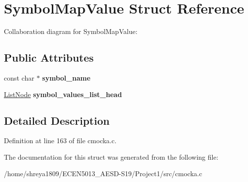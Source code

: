\hypertarget{structSymbolMapValue}{}\section{Symbol\+Map\+Value Struct Reference}
\label{structSymbolMapValue}


Collaboration diagram for Symbol\+Map\+Value\+:
\subsection*{Public Attributes}
\begin{DoxyCompactItemize}
\item 
\mbox{\label{structSymbolMapValue_a7d187f5727db7dc9352464d3bf803320}} 
const char $\ast$ {\bfseries symbol\+\_\+name}
\item 
\mbox{\label{structSymbolMapValue_aa5dec3b9736433e5ec2a8809a1032b23}} 
\hyperlink{structListNode}{List\+Node} {\bfseries symbol\+\_\+values\+\_\+list\+\_\+head}
\end{DoxyCompactItemize}


\subsection{Detailed Description}


Definition at line 163 of file cmocka.\+c.



The documentation for this struct was generated from the following file\+:\begin{DoxyCompactItemize}
\item 
/home/shreya1809/\+E\+C\+E\+N5013\+\_\+\+A\+E\+S\+D-\/\+S19/\+Project1/src/cmocka.\+c\end{DoxyCompactItemize}
